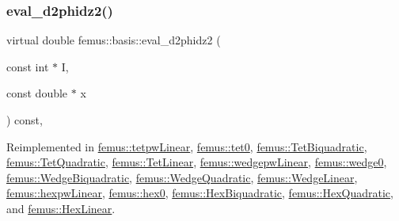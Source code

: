 \mbox{\label{classfemus_1_1basis_a9d32da05f49ba2c989fec04fb7836c39}} 
\subsubsection{\texorpdfstring{eval\+\_\+d2phidz2()}{eval\_d2phidz2()}\hspace{0.1cm}{\footnotesize\ttfamily [2/2]}}
{\footnotesize\ttfamily virtual double femus\+::basis\+::eval\+\_\+d2phidz2 (\begin{DoxyParamCaption}\item[{const int $\ast$}]{I,  }\item[{const double $\ast$}]{x }\end{DoxyParamCaption}) const\hspace{0.3cm}{\ttfamily [inline]}, {\ttfamily [virtual]}}



Reimplemented in \mbox{\hyperlink{classfemus_1_1tetpw_linear_a199593a6ae0073aaa87a632933111e05}{femus\+::tetpw\+Linear}}, \mbox{\hyperlink{classfemus_1_1tet0_a8ce29003823d07fa76934c881b99aa40}{femus\+::tet0}}, \mbox{\hyperlink{classfemus_1_1_tet_biquadratic_a416f03147427a322d96feb511dd6c6d0}{femus\+::\+Tet\+Biquadratic}}, \mbox{\hyperlink{classfemus_1_1_tet_quadratic_aeb639b58481285526a502c38bec1fcbf}{femus\+::\+Tet\+Quadratic}}, \mbox{\hyperlink{classfemus_1_1_tet_linear_adc5774a2ba2c00070315ecad91395f51}{femus\+::\+Tet\+Linear}}, \mbox{\hyperlink{classfemus_1_1wedgepw_linear_a19617340c1a5d61309401bd1e4e4abe5}{femus\+::wedgepw\+Linear}}, \mbox{\hyperlink{classfemus_1_1wedge0_abdda569dd9042829c15483e9c2000be4}{femus\+::wedge0}}, \mbox{\hyperlink{classfemus_1_1_wedge_biquadratic_abbcd4e11513f29e03873a65c911f4a13}{femus\+::\+Wedge\+Biquadratic}}, \mbox{\hyperlink{classfemus_1_1_wedge_quadratic_a1fe92bed37b71a6831d978a54868b922}{femus\+::\+Wedge\+Quadratic}}, \mbox{\hyperlink{classfemus_1_1_wedge_linear_a055172338aa9af21099a59e6ebfbb64e}{femus\+::\+Wedge\+Linear}}, \mbox{\hyperlink{classfemus_1_1hexpw_linear_a20b5ae15c57b98fce4255ee29f36456d}{femus\+::hexpw\+Linear}}, \mbox{\hyperlink{classfemus_1_1hex0_a8b54d2de54c8c30de2ead325c661a428}{femus\+::hex0}}, \mbox{\hyperlink{classfemus_1_1_hex_biquadratic_a4810a64e48546a6d0fc3050dccbc5f1b}{femus\+::\+Hex\+Biquadratic}}, \mbox{\hyperlink{classfemus_1_1_hex_quadratic_a0720366452fe8a95e1d54bbd46e9c174}{femus\+::\+Hex\+Quadratic}}, and \mbox{\hyperlink{classfemus_1_1_hex_linear_a0f8c75ba515b33fdbe02d7c98a233273}{femus\+::\+Hex\+Linear}}.

